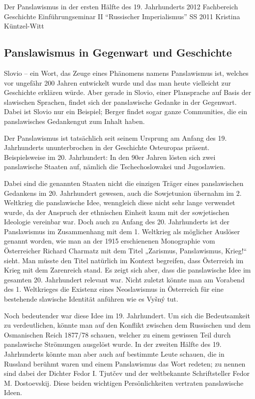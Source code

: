 \documentclass{../../sem_paper}
\begin{document}
\titlepg
{Der Panslawismus in der ersten Hälfte des 19. Jahrhunderts}
{2012}
{Fachbereich Geschichte}
{Einführungseminar II "`Russischer Imperialismus"'}
{SS 2011}
{Kristina Küntzel-Witt}
\tocpaper


\subsection*{Panslawismus in Gegenwart und Geschichte}
Slovio – ein Wort, das Zeuge eines Phänomens namens Panslawismus ist, welches vor
ungefähr 200 Jahren entwickelt wurde und das man heute vielleicht zur Geschichte erklären
würde. Aber gerade in Slovio, einer Plansprache auf Basis der slawischen Sprachen, findet
sich der panslawische Gedanke in der Gegenwart. Dabei ist Slovio nur ein Beispiel; Berger\autocite{berger} findet sogar ganze Communities, die ein panslawisches Gedankengut zum Inhalt
haben.

Der Panslawismus ist tatsächlich seit seinem Ursprung am Anfang des 19. Jahrhunderts
ununterbrochen in der Geschichte Osteuropas präsent. Beispielsweise im 20. Jahrhundert:
In den 90er Jahren lösten sich zwei panslawische Staaten auf, nämlich die Tschechoslowakei
und Jugoslawien.

Dabei sind die genannten Staaten nicht die einzigen Träger eines panslawischen Gedankens
im 20. Jahrhundert gewesen, auch die Sowjetunion übernahm im 2. Weltkrieg die
panslawische Idee, wenngleich diese nicht sehr lange verwendet wurde, da der Anspruch der
ethnischen Einheit kaum mit der sowjetischen Ideologie vereinbar war.\autocite[9]{troebst}
Doch auch zu Anfang des 20. Jahrhunderts ist der Panslawismus im Zusammenhang mit dem
1. Weltkrieg als möglicher Auslöser genannt worden, wie man an der 1915 erschienenen
Monographie vom Österreicher Richard Charmatz mit dem Titel „Zarismus, Panslawismus,
Krieg!“ sieht. Man müsste den Titel natürlich im Kontext begreifen, dass Österreich im Krieg
mit dem Zarenreich stand. Es zeigt sich aber, dass die panslawische Idee im gesamten 20.
Jahrhundert relevant war. Nicht zuletzt könnte man am Vorabend des 1. Weltkrieges die
Existenz eines Neoslawismus in Österreich für eine bestehende slawische Identität anführen
wie es Vyšný\autocite{vyshny} tut.

Noch bedeutender war diese Idee im 19. Jahrhundert. Um sich die Bedeutsamkeit zu
verdeutlichen, könnte man auf den Konflikt zwischen dem Russischen und dem Osmanischen
Reich 1877/78 schauen, welcher zu einem gewissen Teil durch panslawische Strömungen
ausgelöst wurde. In der zweiten Hälfte des 19. Jahrhunderts könnte man aber auch auf
bestimmte Leute schauen, die in Russland berühmt waren und einem Panslawismus das Wort
redeten; zu nennen sind dabei der Dichter Fedor I. Tjutčev und der weltbekannte Schriftsteller
Fedor M. Dostoevskij. Diese beiden wichtigen Persönlichkeiten vertraten panslawische Ideen.
\end{document}
